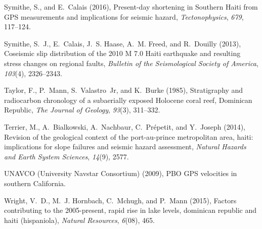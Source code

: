 \documentclass[linenumbers,draft]{agujournal}
\begin{document}
\begin{thebibliography}{62}
Symithe, S., and E.~Calais (2016), {Present-day shortening in Southern Haiti
  from GPS measurements and implications for seismic hazard},
  \textit{Tectonophysics}, \textit{679}, 117--124.

Symithe, S.~J., E.~Calais, J.~S. Haase, A.~M. Freed, and R.~Douilly (2013),
  {Coseismic slip distribution of the 2010 M 7.0 Haiti earthquake and resulting
  stress changes on regional faults}, \textit{Bulletin of the Seismological
  Society of America}, \textit{103}(4), 2326--2343.

Taylor, F., P.~Mann, S.~Valastro~Jr, and K.~Burke (1985), Stratigraphy and
  radiocarbon chronology of a subaerially exposed {Holocene coral reef,
  Dominican Republic}, \textit{The Journal of Geology}, \textit{93}(3),
  311--332.

Terrier, M., A.~Bialkowski, A.~Nachbaur, C.~Pr{\'e}petit, and Y.~Joseph (2014),
  Revision of the geological context of the port-au-prince metropolitan area,
  haiti: implications for slope failures and seismic hazard assessment,
  \textit{Natural Hazards and Earth System Sciences}, \textit{14}(9), 2577.

{UNAVCO (University Navstar Consortium)} (2009), {PBO GPS velocities in
  southern California}.

Wright, V.~D., M.~J. Hornbach, C.~Mchugh, and P.~Mann (2015), Factors
  contributing to the 2005-present, rapid rise in lake levels, dominican
  republic and haiti (hispaniola), \textit{Natural Resources}, \textit{6}(08),
  465.

\end{thebibliography}

\clearpage
\end{document}
